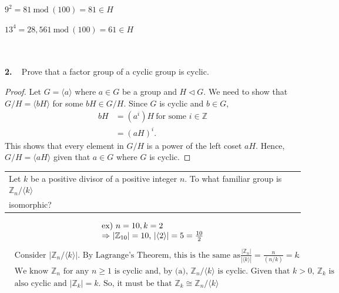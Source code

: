 \documentclass[12pt, letterpaper]{article}
\begin{document}
\begin{center}
    $9^{2} = 81 \ \text{mod}\ (100) = 81 \in H$ \\ 
    \Rightarrow {}
\end{center}
\begin{center}
    $13^{4} = 28,561 \ \text{mod} \ (100) = 61 \in H$ \\
    \Rightarrow \ 
\end{center}
\\
\noindent \textbf{2.} \  Prove that a factor group of a cyclic group is cyclic.
\begin{proof}
    Let $G = \langle a \rangle$ where $a \in G$ be a group and $H \lhd G$. We need to show that $G/H = \langle bH \rangle$ for some $bH \in G/H$. Since $G$ is cyclic and $b \in G$, 
    \begin{align*}
        bH &= (a^i)H \ \text{for some $i \in \mathbb{Z}$}\\
        &= (aH)^i.
    \end{align*}
    This shows that every element in $G/H$ is a power of the left coset $aH$. Hence, $G/H =\langle aH \rangle$ given that $a \in G$ where $G$ is cyclic.
\end{proof} \vspace{0.2em}
 \begin{tabular}[t]{l}
     Let $k$ be a positive divisor of a positive integer $n$. To what familiar group is $\mathbb{Z}_{n}/\langle  k \rangle$  \\
     isomorphic?
\end{tabular}
\begin{align*}
    \begin{tabular}[t]{l}
         ex) $n = 10, k = 2$ \\
         $\Rightarrow$ $|\mathbb{Z}_{10}| = 10$, $|\langle 2 \rangle| = 5 = \frac{10}{2}$ 
    \end{tabular}
\end{align*}
\[
\boxed{
\begin{aligned}
    &\text{Consider $|\mathbb{Z}_n / \langle k \rangle|$. By Lagrange's Theorem, this is the same as$\frac{|\mathbb{Z}_n|}{|\langle k \rangle|} = \frac{n}{(n/k)}= k$}.\\
    &\text{We know $\mathbb{Z}_n$ for any $n \geq 1$ is cyclic and, by (a), $\mathbb{Z}_n / \langle k \rangle$ is cyclic. Given that $k > 0$, $\mathbb{Z}_{k}$ is } \\
    &\text{also cyclic and $|\mathbb{Z}_k| = k$. So, it must be that $\mathbb{Z}_k \cong \mathbb{Z}_n/\langle k \rangle$}
    
\end{aligned}
}
\]
\vspace{0.2em}
\end{document}
